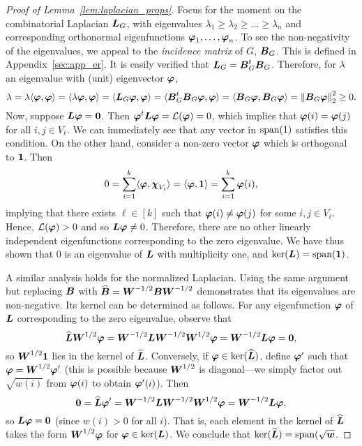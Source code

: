\begin{proof}[Proof of Lemma~\ref{lem:laplacian_props}]
	Focus for the moment on the combinatorial Laplacian  $\vb*{L}_G$, with eigenvalues $\lambda_1\geq \lambda_2\geq \dots \geq \lambda_n$ and corresponding orthonormal eigenfunctions $\vb*{\varphi}_1,\dots,\vb*{\varphi}_n$.
	To see the non-negativity of the eigenvalues, we appeal  to  the \emph{incidence matrix} of $G$,  $\vb*{B}_G$. This is defined in Appendix~\ref{sec:app_er}. It is easily verified  that  $\vb*{L}_G=\vb*{B}_G^t\vb*{B}_G$. 
	Therefore,  for $\lambda$ an eigenvalue with (unit) eigenvector $\vb*{\varphi}$,
	\begin{equation*}
	\lambda = \lambda\langle \vb*{\varphi},\vb*{\varphi}\rangle = \langle \lambda \vb*{\varphi},\vb*{\varphi}\rangle = \langle \vb*{L}_G\vb*{\varphi},\vb*{\varphi}\rangle = \langle \vb*{B}_G^t \vb*{B}_G\vb*{\varphi},\vb*{\varphi}\rangle = \langle \vb*{B}_G\vb*{\varphi},\vb*{B}_G\vb*{\varphi}\rangle =\norm{\vb*{B}_G\vb*{\varphi}}_2^2 \geq 0.
	\end{equation*}
	Now, suppose $\vb*{L}\vb*{\varphi}=\vb{0}$. Then $\vb*{\varphi}^t\vb*{L}\vb*{\varphi}=\mathcal{L}(\vb*{\varphi})=0$, which implies that $\vb*{\varphi}(i)=\vb*{\varphi}(j)$ for all $i,j\in V_\ell$. We can immediately see that any vector in $\textnormal{span}(1)$ satisfies this condition. 
	On the other hand, consider a non-zero vector $\vb*{\varphi}$ which is orthogonal to $\vb{1}$. Then 
	\[0=\sum_{i=1}^k \langle \vb*{\varphi},\boldsymbol{\chi}_{V_i}\rangle = \langle \vb*{\varphi},\vb{1} \rangle=\sum_{i=1}^k \vb*{\varphi}(i),\]
	implying that there exists $\ell\in[k]$ such that $\vb*{\varphi}(i)\neq\vb*{\varphi}(j)$ for some $i,j\in V_\ell$. Hence, $\mathcal{L}(\vb*{\varphi})>0$ and so $\vb*{L}\vb*{\varphi}\neq 0$. Therefore, there are no other linearly independent eigenfunctions corresponding to the zero eigenvalue.  
	We have thus shown that 0 is an eigenvalue of $\vb*{L}$ with multiplicity one, and $\ker(\vb*{L})=\textnormal{span}(\vb{1})$. 
	
	A similar analysis holds for the normalized Laplacian. Using the same argument but replacing $\vb*{B}$ with $\widehat{\vb*{B}}=\vb*{W}^{-1/2}\vb*{B}\vb*{W}^{-1/2}$ demonstrates that its eigenvalues are non-negative. Its kernel can be determined as follows. For any eigenfunction $\vb*{\varphi}$ of $\vb*{L}$ corresponding to the zero eigenvalue, observe that 
	\[\widehat{\vb*{L}}\vb*{W}^{1/2}\vb*{\varphi} = \vb*{W}^{-1/2}\vb*{L}\vb*{W}^{-1/2}\vb*{W}^{1/2}\vb*{\varphi} = \vb*{W}^{-1/2}\vb*{L}\vb*{\varphi} = \vb{0},\]
	so $\vb*{W}^{1/2}\vb{1}$ lies in the kernel of $\widehat{\vb*{L}}$.
	Conversely, if $\vb*{\varphi}\in\ker(\widehat{\vb*{L}})$, define $\vb*{\varphi}'$ such that $\vb*{\varphi}=\vb*{W}^{1/2}\vb*{\varphi}'$ (this is possible because $\vb*{W}^{1/2}$ is diagonal---we simply factor out $\sqrt{w(i)}$ from $\vb*{\varphi}(i)$ to obtain $\vb*{\varphi}'(i)$). Then 
	\[\vb{0} =\widehat{\vb*{L}}\vb*{\varphi}' = \vb*{W}^{-1/2}\vb*{L} \vb*{W}^{-1/2}\vb*{W}^{1/2}\vb*{\varphi} = \vb*{W}^{-1/2}\vb*{L}\vb*{\varphi},\]
	so $\vb*{L}\vb*{\varphi}=\vb{0}$ (since $w(i)>0$ for all $i$). That is, each element in the kernel of $\widehat{\vb*{L}}$ takes the form $\vb*{W}^{1/2}\vb*{\varphi}$ for $\vb*{\varphi}\in\ker(\vb*{L})$. We conclude that $\ker(\widehat{\vb*{L}})=\textnormal{span}(\sqrt{\vb*{w}}$. 
\end{proof}


